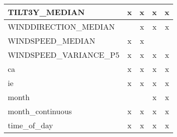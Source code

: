 \begin{table}[!htbp]
\begin{tabular}{lcccc}
        TILT3Y\_MEDIAN       &      x &      x &      x &      x   \\ \hline
        WINDDIRECTION\_MEDIAN &        &      x &      x &      x  \\ \hline
        WINDSPEED\_MEDIAN     &      x &      x &        &         \\ \hline
        WINDSPEED\_VARIANCE\_P5 &      x &      x &      x &      x  \\ \hline
        ca                   &      x &      x &      x &      x    \\ \hline
        ie                   &      x &      x &      x &      x    \\ \hline
        month                &        &        &      x &      x    \\ \hline
        month\_continuous    &      x &      x &      x &      x    \\ \hline
        time\_of\_day        &      x &      x &      x &      x    \\ \hline
    \end{tabular}        
    \label{tab:exp2_top50_features2}
\end{table}


